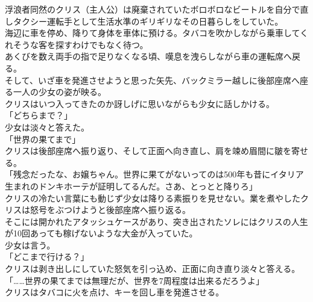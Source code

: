 \documentclass[b5j,10pt,openany]{jsbook}
\begin{document}
浮浪者同然のクリス（主人公）は廃棄されていたボロボロなビートルを自分で直しタクシー運転手として生活水準のギリギリなその日暮らしをしていた。\\海辺に車を停め、降りて身体を車体に預ける。タバコを吹かしながら乗車してくれそうな客を探すわけでもなく待つ。\\あくびを数え両手の指で足りなくなる頃、嘆息を洩らしながら車の運転席へ戻る。\\そして、いざ車を発進させようと思った矢先、バックミラー越しに後部座席へ座る一人の少女の姿が映る。\\クリスはいつ入ってきたのか訝しげに思いながらも少女に話しかける。\\「どちらまで？」\\少女は淡々と答えた。\\「世界の果てまで」\\クリスは後部座席へ振り返り、そして正面へ向き直し、肩を竦め眉間に皺を寄せる。\\「残念だったな、お嬢ちゃん。世界に果てがないってのは500年も昔にイタリア生まれのドンキホーテが証明してるんだ。さあ、とっとと降りろ」\\クリスの冷たい言葉にも動じず少女は降りる素振りを見せない。業を煮やしたクリスは怒号をぶつけようと後部座席へ振り返る。\\そこには開かれたアタッシュケースがあり、突き出されたソレにはクリスの人生が10回あっても稼げないような大金が入っていた。\\少女は言う。\\「どこまで行ける？」\\クリスは剥き出しにしていた怒気を引っ込め、正面に向き直り淡々と答える。\\「\ldots{}\ldots{}世界の果てまでは無理だが、世界を7周程度は出来るだろうよ」\\クリスはタバコに火を点け、キーを回し車を発進させる。
\end{document}
